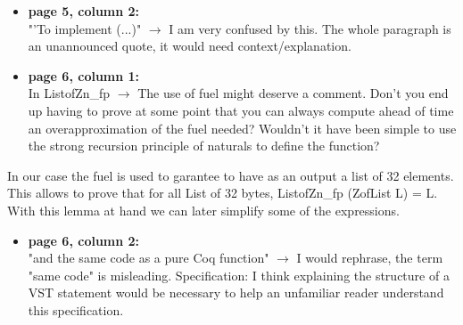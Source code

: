 \begin{itemize}
  \item \textbf{page 5, column 2:}\\
    "'To implement (...)" $\rightarrow$ I am very confused by this. The whole paragraph is an unannounced quote, it would need context/explanation.
\end{itemize}
\begin{answer}
\end{answer}

\begin{itemize}
  \item \textbf{page 6, column 1:}\\
    In ListofZn\_fp $\rightarrow$ The use of fuel might deserve a comment. Don't you end up having to prove at some point that you can always compute ahead of time an overapproximation of the fuel needed? Wouldn't it have been simple to use the strong recursion principle of naturals to define the function?
\end{itemize}
    \begin{answer}
      In our case the fuel is used to garantee to have as an output a list of 32 elements. This allows to prove that for all List of 32 bytes, ListofZn\_fp (ZofList L) = L. With this lemma at hand we can later simplify some of the expressions.
    \end{answer}

\begin{itemize}
  \item \textbf{page 6, column 2:}\\
    "and the same code as a pure Coq function" $\rightarrow$ I would rephrase, the term "same code" is misleading.
    Specification: I think explaining the structure of a VST statement would be necessary to help an unfamiliar reader understand this specification.
\end{itemize}
\begin{answer}
\end{answer}

